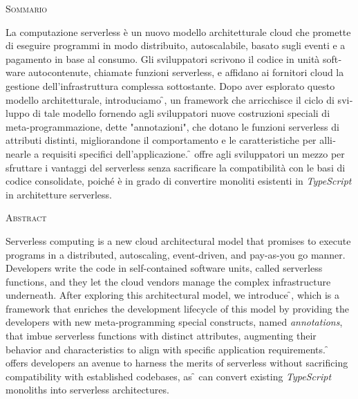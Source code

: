 \begin{center}
  \textsc{Sommario}
\end{center}
%
\noindent
%
\begin{otherlanguage}{italian}
La computazione serverless è un nuovo modello architetturale cloud che promette di eseguire programmi in modo distribuito, autoscalabile, basato sugli eventi e a pagamento in base al consumo. Gli sviluppatori scrivono il codice in unità software autocontenute, chiamate funzioni serverless, e affidano ai fornitori cloud la gestione dell'infrastruttura complessa sottostante. Dopo aver esplorato questo modello architetturale, introduciamo \f{}, un framework che arricchisce il ciclo di sviluppo di tale modello fornendo agli sviluppatori nuove costruzioni speciali di meta-programmazione, dette "annotazioni", che dotano le funzioni serverless di attributi distinti, migliorandone il comportamento e le caratteristiche per allinearle a requisiti specifici dell'applicazione. \f{} offre agli sviluppatori un mezzo per sfruttare i vantaggi del serverless senza sacrificare la compatibilità con le basi di codice consolidate, poiché è in grado di convertire monoliti esistenti in \textit{TypeScript} in architetture serverless.
\end{otherlanguage}

\newpage


\begin{center}
  \textsc{Abstract}
\end{center}
%
\noindent
%
Serverless computing is a new cloud architectural model that promises
to execute programs in a distributed, autoscaling, event-driven, and pay-as-you go manner.
Developers write the code in self-contained software units, called serverless functions,
and they let the cloud vendors manage the complex infrastructure underneath.
After exploring this architectural model, we introduce \f{}, which is a framework that enriches the development
lifecycle of this model by providing the developers with new
meta-programming special constructs, named \textit{annotations},
that imbue serverless functions with distinct attributes,
augmenting their behavior and characteristics to align with specific application requirements.
\f{} offers developers an avenue to harness the merits of serverless
without sacrificing compatibility with established codebases, as \f{} can convert
existing \textit{TypeScript} monoliths into serverless architectures.

\newpage
\
\thispagestyle{empty}
\cleardoublepage
